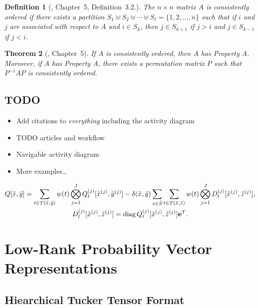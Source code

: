 \documentclass[a4paper,11pt,twoside,openright]{memoir}
\renewcommand*{\vec}[1]{\boldsymbol{\mathrm{#1}}}
\newcommand*{\macroS}{}\let\macroS\tilde
\DeclareMathOperator{\diag}{diag}
\theoremstyle{my}
\newtheorem{thm}{Theorem}[chapter]
\newtheorem{dfn}[thm]{Definition}
\begin{document}
\begin{dfn}[\citet{young1971iterative}, Chapter~5, Definition~3.2.]
  The $n \times n$ matrix $A$ is \emph{consistently ordered} if there
  exists a partition
  $S_1 \uplus S_2 \uplus \cdots \uplus S_t = \{1, 2, \ldots, n\}$
  such that if $i$ and $j$ are associated with respect to $A$ and
  $i \in S_k$, then $j \in S_{k + 1}$ if $j > i$ and $j \in S_{k - 1}$
  if $j < i$.
\end{dfn}

\begin{thm}[\citet{young1971iterative}, Chapter~5]
  If $A$ is consistently ordered, then $A$ has Property A. Moreover,
  if $A$ has Property A, there exists a permutation matrix $P$ such
  that $P^{-1} A P$ is consistently ordered.
\end{thm}

\section{TODO}

\begin{itemize}
\item Add citations to \emph{everything} including the activity
  diagram
\item TODO articles and workflow
\item Navigable activity diagram
\item More examples\ldots
\end{itemize}

\begin{gather}
  Q[\macroS{x}, \macroS{y}] = \sum_{t \in T(\macroS{x}, \macroS{y})}
  w(t) \bigotimes_{j = 1}^J Q_{t}^{(j)}[\macroS{x}^{(j)},
  \macroS{y}^{(j)}]
  - \delta(\macroS{x}, \macroS{y}) \sum_{\macroS{z} \in \macroS{S}} \sum_{t \in T(\macroS{x}, \macroS{z})}
  w(t) \bigotimes_{j = 1}^J D_{t}^{(j)}[\macroS{x}^{(j)},
  \macroS{z}^{(j)}] \text, \\
  D_{t}^{(j)}[\macroS{x}^{(j)}, \macroS{z}^{(j)}] = \diag
  Q_{t}^{(j)}[\macroS{x}^{(j)}, \macroS{z}^{(j)}] \vec{e}^T \text.
\end{gather}

\chapter{Low-Rank Probability Vector Representations}

\section{Hiearchical Tucker Tensor Format}
\end{document}
